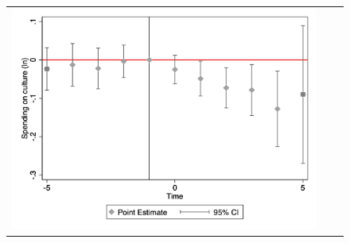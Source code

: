 \begin{figure}[!ht]
\begin{tabular}{@{}ccc@{}}
\begin{minipage}[t]{0.32\textwidth}
            \includegraphics[width=\linewidth]{images/total population/caseventdd_ln_q4_05_step1.jpg}
            \label{fig:casculture}
        \end{minipage} \\[10pt]


\end{tabular}
\end{figure}
